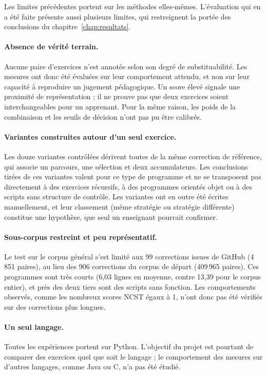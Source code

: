 \documentclass[12pt,a4paper,oneside]{report}
\begin{document}
Les limites précédentes portent sur les méthodes elles-mêmes. L'évaluation
qui en a été faite présente aussi plusieurs limites, qui restreignent la
portée des conclusions du chapitre~\ref{chap:resultats}.

\paragraph{Absence de vérité terrain.}
Aucune paire d'exercices n'est annotée selon son degré de substituabilité.
Les mesures ont donc été évaluées sur leur comportement attendu, et non sur
leur capacité à reproduire un jugement pédagogique. Un score élevé signale
une proximité de représentation ; il ne prouve pas que deux exercices
soient interchangeables pour un apprenant. Pour la même raison, les poids
de la combinaison et les seuils de décision n'ont pas pu être calibrés.

\paragraph{Variantes construites autour d'un seul exercice.}
Les douze variantes contrôlées dérivent toutes de la même correction de
référence, qui associe un parcours, une sélection et deux accumulateurs.
Les conclusions tirées de ces variantes valent pour ce type de programme et
ne se transposent pas directement à des exercices récursifs, à des
programmes orientés objet ou à des scripts sans structure de contrôle. Les
variantes ont en outre été écrites manuellement, et leur classement (même
stratégie ou stratégie différente) constitue une hypothèse, que seul un
enseignant pourrait confirmer.

\paragraph{Sous-corpus restreint et peu représentatif.}
Le test sur le corpus général s'est limité aux 99 corrections issues de
GitHub (4\,851 paires), au lieu des 906 corrections du corpus de départ
(409\,965 paires). Ces programmes sont très courts
(6,03 lignes en moyenne, contre 13,39 pour le corpus entier), et près des
deux tiers sont des scripts sans fonction. Les comportements observés,
comme les nombreux scores NCST égaux à 1, n'ont donc pas été vérifiés sur
des corrections plus longues.

\paragraph{Un seul langage.}
Toutes les expériences portent sur Python. L'objectif du projet est
pourtant de comparer des exercices quel que soit le langage ; le
comportement des mesures sur d'autres langages, comme Java ou C, n'a pas été
étudié.
\end{document}
